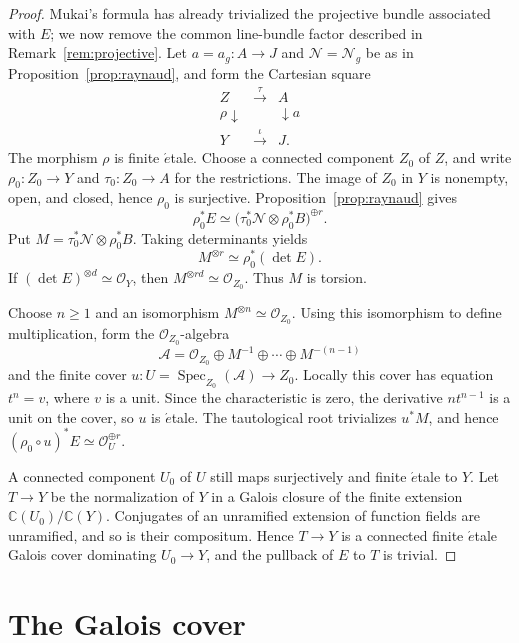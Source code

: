 \documentclass[a4paper]{amsart}
\theoremstyle{remark}
\newcommand{\OO}{\mathcal O}
\newcommand{\CC}{\mathbb C}
\begin{document}
\begin{proof}
Mukai's formula has already trivialized the projective bundle associated with \(E\); we now remove the common line-bundle factor described in Remark~\ref{rem:projective}.  Let
\(a=a_g:A\to J\) and \(\mathcal N=\mathcal N_g\) be as in Proposition~\ref{prop:raynaud}, and form the Cartesian square
\[
\begin{array}{ccc}
 Z & \xrightarrow{\ \tau\ } & A\\
 \rho\downarrow && \downarrow a\\
 Y & \xrightarrow{\ \iota\ } & J.
\end{array}
\]
The morphism \(\rho\) is finite \(\acute{e}\)tale.  Choose a connected component \(Z_0\) of \(Z\), and write \(\rho_0:Z_0\to Y\) and \(\tau_0:Z_0\to A\) for the restrictions.  The image of \(Z_0\) in \(Y\) is nonempty, open, and closed, hence \(\rho_0\) is surjective.  Proposition~\ref{prop:raynaud} gives
\[
 \rho_0^*E
 \simeq\bigl(\tau_0^*\mathcal N\otimes\rho_0^*B\bigr)^{\oplus r}.
\]
Put \(M=\tau_0^*\mathcal N\otimes\rho_0^*B\).  Taking determinants yields
\[
 M^{\otimes r}\simeq\rho_0^*(\det E).
\]
If \((\det E)^{\otimes d}\simeq\OO_Y\), then
\(M^{\otimes rd}\simeq\OO_{Z_0}\).  Thus \(M\) is torsion.

Choose \(n\geq 1\) and an isomorphism
\(M^{\otimes n}\simeq\OO_{Z_0}\).  Using this isomorphism to define multiplication, form the \(\OO_{Z_0}\)-algebra
\[
 \mathcal A=\OO_{Z_0}\oplus M^{-1}\oplus\cdots\oplus M^{-(n-1)}
\]
and the finite cover
\(u:U=\operatorname{Spec}_{Z_0}(\mathcal A)\to Z_0\).  Locally this cover has equation \(t^n=v\), where \(v\) is a unit.  Since the characteristic is zero, the derivative \(nt^{n-1}\) is a unit on the cover, so \(u\) is \(\acute{e}\)tale.  The tautological root trivializes \(u^*M\), and hence
\((\rho_0\circ u)^*E\simeq\OO_U^{\oplus r}\).

A connected component \(U_0\) of \(U\) still maps surjectively and finite \(\acute{e}\)tale to \(Y\).  Let \(T\to Y\) be the normalization of \(Y\) in a Galois closure of the finite extension \(\CC(U_0)/\CC(Y)\).  Conjugates of an unramified extension of function fields are unramified, and so is their compositum.  Hence \(T\to Y\) is a connected finite \(\acute{e}\)tale Galois cover dominating \(U_0\to Y\), and the pullback of \(E\) to \(T\) is trivial.
\end{proof}

\section{The Galois cover}
\end{document}
